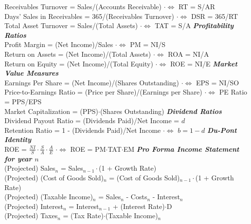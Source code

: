 \documentclass{letter}
\newcommand{\textib}[1]{\textit{\textbf{{#1}}}}
\begin{document}
Receivables Turnover = Sales/(Accounts Receivable) \leaders\hbox{$\cdot$}\hfill $\iff$ RT = S/AR \\
Days' Sales in Receivables = 365/(Receivables Turnover) \leaders\hbox{$\cdot$}\hfill $\iff$ DSR = 365/RT \\
Total Asset Turnover = Sales/(Total Assets) \leaders\hbox{$\cdot$}\hfill $\iff$ TAT = S/A
\newline
\textib{Profitability Ratios} \\
Profit Margin = (Net Income)/Sales \leaders\hbox{$\cdot$}\hfill $\iff$ PM = NI/S \\
Return on Assets = (Net Income)/(Total Assets) \leaders\hbox{$\cdot$}\hfill $\iff$ ROA = NI/A \\
Return on Equity = (Net Income)/(Total Equity) \leaders\hbox{$\cdot$}\hfill $\iff$ ROE = NI/E
\newline
\textib{Market Value Measures} \\
Earnings Per Share = (Net Income)/(Shares Outstanding) \leaders\hbox{$\cdot$}\hfill $\iff$ EPS = NI/SO \\
Price-to-Earnings Ratio = (Price per Share)/(Earnings per Share) \leaders\hbox{$\cdot$}\hfill $\iff$ PE Ratio = PPS/EPS \\
Market Capitalization = (PPS)$\cdot$(Shares Outstanding)
\newline
\textib{Dividend Ratios} \\
Dividend Payout Ratio = (Dividends Paid)/Net Income = $d$ \\
Retention Ratio = 1 - (Dividends Paid)/Net Income \leaders\hbox{$\cdot$}\hfill $\iff$ $b = 1 - d$
\newline
\textib{Du-Pont Identity} \\
ROE = $\frac{NI}{S} \cdot \frac{S}{A} \cdot \frac{A}{E}$ \leaders\hbox{$\cdot$}\hfill $\iff$ ROE = PM$\cdot$TAT$\cdot$EM
\newline
\textib{Pro Forma Income Statement for year $n$} \\
(Projected) Sales$_n$ = Sales$_{n - 1} \cdot$(1 + Growth Rate) \\
(Projected) (Cost of Goods Sold)$_n$ = (Cost of Goods Sold)$_{n - 1} \cdot$(1 + Growth Rate) \\
(Projected) (Taxable Income)$_n$ = Sales$_n$ - Costs$_n$ - Interest$_n$ \\
(Projected) Interest$_n$ = Interest$_{n - 1}$ + (Interest Rate)$\cdot$D \\
(Projected) Taxes$_n$ = (Tax Rate)$\cdot$(Taxable Income)$_n$ \\
\end{document}
